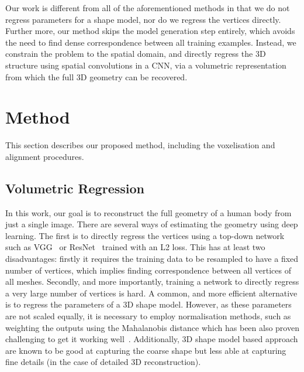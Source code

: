Our work is different from all of the aforementioned methods in that
we do not regress parameters for a shape model, nor do we regress the
vertices directly. Further more, our method skips the model generation
step entirely, which avoids the need to find dense correspondence
between all training examples. Instead, we constrain the problem to
the spatial domain, and directly regress the 3D structure using
spatial convolutions in a CNN, via a volumetric representation from
which the full 3D geometry can be recovered.



\section{Method}

This section describes our proposed method, including the voxelisation
and alignment procedures.

\subsection{Volumetric Regression}

In this work, our goal is to reconstruct the full geometry of a human
body from just a single image.  There are several ways of estimating
the geometry using deep learning. The first is to directly regress the
vertices using a top-down network such as VGG~\cite{simonyan2014vgg}
or ResNet~\cite{he2015deep} trained with an L2 loss. This has at least
two disadvantages: firstly it requires the training data to be
resampled to have a fixed number of vertices, which implies finding
correspondence between all vertices of all meshes. Secondly, and more
importantly, training a network to directly regress a very large
number of vertices is hard. A common, and more efficient alternative
is to regress the parameters of a 3D shape model. However, as these
parameters are not scaled equally, it is necessary to employ
normalisation methods, such as weighting the outputs using the
Mahalanobis distance which has been also proven challenging to get it
working well~\cite{jackson2017vrn}. Additionally, 3D shape model based
approach are known to be good at capturing the coarse shape but less
able at capturing fine details (in the case of detailed 3D
reconstruction).

